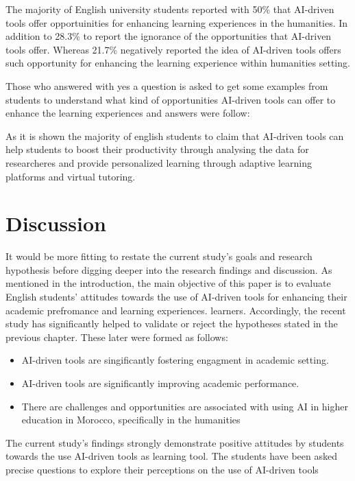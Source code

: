 The majority of English university students reported with 50\% that AI-driven tools offer opportuinities
for enhancing learning experiences in the humanities. In addition to 28.3\% to report the
ignorance of the opportunities that AI-driven tools offer. Whereas 21.7\% negatively reported
the idea of AI-driven tools offers such opportunity for enhancing the learning experience
within humanities setting.


Those who answered with yes a question is asked to get some examples from students
to understand what kind of opportunities AI-driven tools can offer to enhance the learning experiences and answers were follow:


As it is shown the majority of english students to claim that AI-driven tools can
help students to boost their productivity through analysing the data for researcheres
and provide personalized learning through adaptive learning platforms and virtual tutoring.

\section{Discussion}
It would be more fitting to restate the current study’s goals and research hypothesis
before digging deeper into the research findings and discussion. As mentioned in the
introduction, the main objective of this paper is to evaluate English students’ attitudes towards the
use of AI-driven tools for enhancing their academic prefromance and learning experiences.
learners. Accordingly, the recent study has significantly helped
to validate or reject the hypotheses stated in the previous chapter.
These later were formed as follows:
\begin{itemize}
	\item AI-driven tools are singificantly fostering engagment in academic setting.
	\item AI-driven tools are significantly improving academic performance.
	\item There are challenges and opportunities are associated with using AI in higher education
	      in Morocco, specifically in the humanities
\end{itemize}
The current study’s findings strongly demonstrate positive attitudes by students towards
the use AI-driven tools as learning tool. The students have been asked precise questions
to explore their perceptions on the use of AI-driven tools


